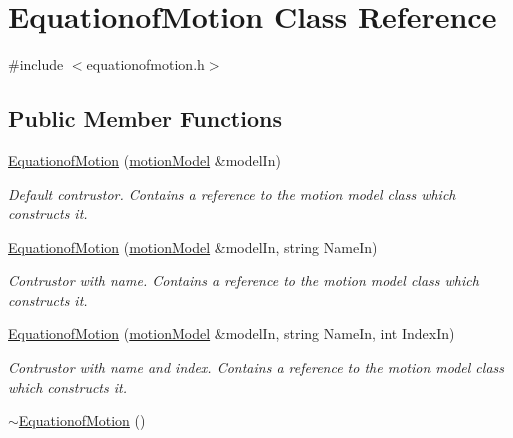 \hypertarget{class_equationof_motion}{\section{Equationof\-Motion Class Reference}
\label{class_equationof_motion}
}


{\ttfamily \#include $<$equationofmotion.\-h$>$}

\subsection*{Public Member Functions}
\begin{DoxyCompactItemize}
\item 
\hyperlink{class_equationof_motion_a1ce981d00a6700309d03bb3d483acf90}{Equationof\-Motion} (\hyperlink{classmotion_model}{motion\-Model} \&model\-In)
\begin{DoxyCompactList}\small\item\em Default contrustor. Contains a reference to the motion model class which constructs it. \end{DoxyCompactList}\item 
\hyperlink{class_equationof_motion_ad3a5fda48c60aa668a620cf2afecaad8}{Equationof\-Motion} (\hyperlink{classmotion_model}{motion\-Model} \&model\-In, string Name\-In)
\begin{DoxyCompactList}\small\item\em Contrustor with name. Contains a reference to the motion model class which constructs it. \end{DoxyCompactList}\item 
\hyperlink{class_equationof_motion_acaeddec0f4205e9dca93db2edefa0a3c}{Equationof\-Motion} (\hyperlink{classmotion_model}{motion\-Model} \&model\-In, string Name\-In, int Index\-In)
\begin{DoxyCompactList}\small\item\em Contrustor with name and index. Contains a reference to the motion model class which constructs it. \end{DoxyCompactList}\item 
\hypertarget{class_equationof_motion_ab06097df1a54719d7a5682babbd9f233}{\hyperlink{class_equationof_motion_ab06097df1a54719d7a5682babbd9f233}{$\sim$\-Equationof\-Motion} ()}\label{class_equationof_motion_ab06097df1a54719d7a5682babbd9f233}


\end{DoxyCompactItemize}
